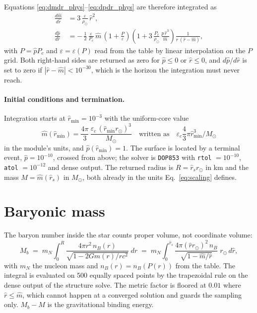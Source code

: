 \documentclass[aps,prc,onecolumn,superscriptaddress,nofootinbib,10pt]{revtex4-2}
\newcommand{\nB}{n_B}
\newcommand{\Msun}{M_\odot}
\newcommand{\rsun}{r_\odot}
\newcommand{\rhosol}{\rho_\odot}
\begin{document}
Equations
\eqref{eq:dmdr_phys}--\eqref{eq:dpdr_phys} are therefore integrated as
%
\begin{align}
\frac{d\hat m}{d\hat r} &= 3\,\frac{\varepsilon}{\rhosol}\,\hat r^2 ,
\label{eq:dmdr}\\[2pt]
\frac{d\hat p}{d\hat r} &=
  -\,\frac{1}{2}\,\frac{\varepsilon}{P_c}\,\hat m\,
   \left(1 + \frac{P}{\varepsilon}\right)
   \left(1 + 3\,\frac{P_c}{\rhosol}\,\frac{\hat p\,\hat r^3}{\hat m}\right)
   \frac{1}{\hat r\,(\hat r - \hat m)} ,
\label{eq:dpdr}
\end{align}
%
with $P = \hat p P_c$ and $\varepsilon = \varepsilon(P)$ read from the table by
linear interpolation on the $P$ grid. Both right-hand sides are returned as
zero for $\hat p \le 0$ or $\hat r \le 0$, and $d\hat p/d\hat r$ is set to zero
if $|\hat r - \hat m| < 10^{-30}$, which is the horizon the integration must
never reach.

\paragraph{Initial conditions and termination.}
Integration starts at $\hat r_{\min} = 10^{-3}$ with the uniform-core value
%
\begin{equation}
\hat m(\hat r_{\min}) = \frac{4\pi}{3}\,
   \frac{\varepsilon_c\, (\hat r_{\min}\rsun)^3}{\Msun}
 \quad\text{written as}\quad
   \varepsilon_c \frac{4}{3}\pi \hat r_{\min}^3 / \Msun
\label{eq:m0}
\end{equation}
%
in the module's units, and $\hat p(\hat r_{\min}) = 1$. The surface is located
by a terminal event, $\hat p = 10^{-10}$, crossed from above; the solver is
\texttt{DOP853} with \texttt{rtol} $=10^{-10}$, \texttt{atol} $=10^{-12}$ and
dense output. The returned radius is $R = \hat r_s \rsun$ in km and the mass
$M = \hat m(\hat r_s)$ in $\Msun$, both already in the units
Eq.~\eqref{eq:scaling} defines.

\section{Baryonic mass}
\label{sec:mb}

The baryon number inside the star counts proper volume, not coordinate volume:
%
\begin{equation}
M_b \;=\; m_N \int_0^{R} \frac{4\pi r^2\, \nB(r)}
                              {\sqrt{1 - 2Gm(r)/rc^2}}\; dr
      \;=\; m_N \int_0^{\hat r_s} \frac{4\pi (\hat r \rsun)^2\, \nB}
                              {\sqrt{1 - \hat m/\hat r}}\; \rsun\, d\hat r ,
\label{eq:Mb}
\end{equation}
%
with $m_N$ the nucleon mass and $\nB(r) = \nB(P(r))$ from the table. The
integral is evaluated on 500 equally spaced points by the trapezoidal rule on
the dense output of the structure solve. The metric factor is floored at
$0.01$ where $\hat r \le \hat m$, which cannot happen at a converged solution
and guards the sampling only. $M_b - M$ is the gravitational binding energy.
\end{document}
